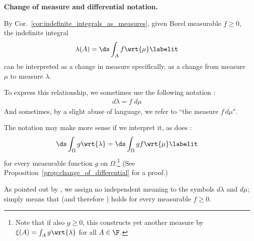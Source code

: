 \documentclass{article} %
\newcommand{\dint}{\ds\int}
\newcommand{\dmu}{\wrt{\mu}}
\begin{document}
\begin{remark}{\textbf{Change of measure and differential notation.}}

 By Cor.~\ref{cor:indefinite_integrals_as_measures},  given Borel measurable $f \geq 0$, the indefinite integral 
%
\begin{align*}
\lambda(A)  =  \ds\int_A f \dmu
\labelit \label{eqn:indefinite_integral_again}
\end{align*}
 can be interpreted as a change in measure specifically, as a change from measure $\mu$ to measure $\lambda$. 
 
To express this relationship, we sometimes use the following notation \cite[pp.~89]{folland1999real}:
%
\begin{align} 
d\lambda = f \; d\mu 
\label{eqn:indefinite_integral_in_differential_form}	
\end{align}
%
And sometimes, by a slight abuse of language, we refer to ``the measure $f \, d\mu$".

The notation may make more sense if we interpret it, as does \cite[pp.~24]{rudin1987real}:
\begin{align*}
\dint_\Omega g \wrt{\lambda} = \dint_\Omega g f \dmu
\labelit \label{eqn:change_of_differential}
\end{align*}
for every measurable function $g$ on $\Omega$.\footnote{Note that if also $g \geq 0$, this constructs yet another measure by $\xi(A) = \int_A g \wrt{\lambda}$ for all $A \in \F$.} (See  Proposition~\ref{prop:change_of_differential} for a proof.) 


As pointed out by \cite[pp.~24]{rudin1987real}, we assign no independent meaning to the symbols 
$d\lambda$ and $d\mu$;  simply means that  (and therefore ) holds for every measurable $f \geq 0$. 

\label{rk:change_of_measure_and_differential_notation}
\end{remark}
\end{document}
